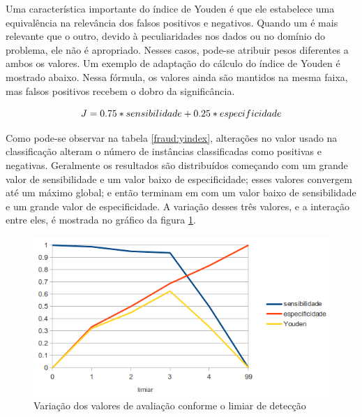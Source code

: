 Uma característica importante do índice de Youden é que ele estabelece uma equivalência na relevância dos falsos positivos e negativos. Quando um é mais relevante que o outro, devido à peculiaridades nos dados ou no domínio do problema, ele não é apropriado. Nesses casos, pode-se atribuir pesos diferentes a ambos os valores. Um exemplo de adaptação do cálculo do índice de Youden é mostrado abaixo. Nessa fórmula, os valores ainda são mantidos na mesma faixa, mas falsos positivos recebem o dobro da significância.

\begin{equation}
    \vspace{2mm}
    J = 0.75 * sensibilidade + 0.25 * especificidade
    \vspace{2mm}
\end{equation}

Como pode-se observar na tabela \ref{fraud:yindex}, alterações no valor usado na classificação alteram o número de instâncias classificadas como positivas e negativas. Geralmente os resultados são distribuídos começando com um grande valor de sensibilidade e um valor baixo de especificidade; esses valores convergem até um máximo global; e então terminam em com um valor baixo de sensibilidade e um grande valor de especificidade. A variação desses três valores, e a interação entre eles, é mostrada no gráfico da figura \ref{fraud:threshold}.

\vspace{0.5cm}
\begin{figure}[h!]
    \centering
    \caption{Variação dos valores de avaliação conforme o limiar de detecção}
    \label{fraud:threshold}
    \vspace{0.5cm}
    \includegraphics[scale=0.5]{img/threshold.png}
    \vspace{0.5cm}
\end{figure}
\vspace{0.5cm}

